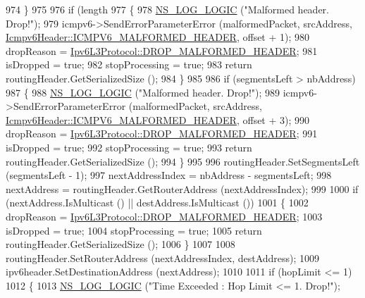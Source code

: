 \begin{DoxyCode}
974     \}
975 
976   \textcolor{keywordflow}{if} (length %
977     \{
978       \hyperlink{group__logging_ga88acd260151caf2db9c0fc84997f45ce}{NS\_LOG\_LOGIC} (\textcolor{stringliteral}{"Malformed header. Drop!"});
979       icmpv6->SendErrorParameterError (malformedPacket, srcAddress, 
      \hyperlink{classns3_1_1Icmpv6Header_ae9230cd167393f553a3c2ded106858caa7dd2df96e3d38d1988dbfc92f7fea0cb}{Icmpv6Header::ICMPV6\_MALFORMED\_HEADER}, offset + 1);
980       dropReason = \hyperlink{classns3_1_1Ipv6L3Protocol_a33c64db9bc35f71ff368b132bfffa37aaddfae41b279341b99d46df16e0d4ea7b}{Ipv6L3Protocol::DROP\_MALFORMED\_HEADER};
981       isDropped = \textcolor{keyword}{true};
982       stopProcessing = \textcolor{keyword}{true};
983       \textcolor{keywordflow}{return} routingHeader.GetSerializedSize ();
984     \}
985 
986   \textcolor{keywordflow}{if} (segmentsLeft > nbAddress)
987     \{
988       \hyperlink{group__logging_ga88acd260151caf2db9c0fc84997f45ce}{NS\_LOG\_LOGIC} (\textcolor{stringliteral}{"Malformed header. Drop!"});
989       icmpv6->SendErrorParameterError (malformedPacket, srcAddress, 
      \hyperlink{classns3_1_1Icmpv6Header_ae9230cd167393f553a3c2ded106858caa7dd2df96e3d38d1988dbfc92f7fea0cb}{Icmpv6Header::ICMPV6\_MALFORMED\_HEADER}, offset + 3);
990       dropReason = \hyperlink{classns3_1_1Ipv6L3Protocol_a33c64db9bc35f71ff368b132bfffa37aaddfae41b279341b99d46df16e0d4ea7b}{Ipv6L3Protocol::DROP\_MALFORMED\_HEADER};
991       isDropped = \textcolor{keyword}{true};
992       stopProcessing = \textcolor{keyword}{true};
993       \textcolor{keywordflow}{return} routingHeader.GetSerializedSize ();
994     \}
995 
996   routingHeader.SetSegmentsLeft (segmentsLeft - 1);
997   nextAddressIndex = nbAddress - segmentsLeft;
998   nextAddress = routingHeader.GetRouterAddress (nextAddressIndex);
999 
1000   \textcolor{keywordflow}{if} (nextAddress.IsMulticast () || destAddress.IsMulticast ())
1001     \{
1002       dropReason = \hyperlink{classns3_1_1Ipv6L3Protocol_a33c64db9bc35f71ff368b132bfffa37aaddfae41b279341b99d46df16e0d4ea7b}{Ipv6L3Protocol::DROP\_MALFORMED\_HEADER};
1003       isDropped = \textcolor{keyword}{true};
1004       stopProcessing = \textcolor{keyword}{true};
1005       \textcolor{keywordflow}{return} routingHeader.GetSerializedSize ();
1006     \}
1007 
1008   routingHeader.SetRouterAddress (nextAddressIndex, destAddress);
1009   ipv6header.SetDestinationAddress (nextAddress);
1010 
1011   \textcolor{keywordflow}{if} (hopLimit <= 1)
1012     \{
1013       \hyperlink{group__logging_ga88acd260151caf2db9c0fc84997f45ce}{NS\_LOG\_LOGIC} (\textcolor{stringliteral}{"Time Exceeded : Hop Limit <= 1. Drop!"});

\end{DoxyCode}
